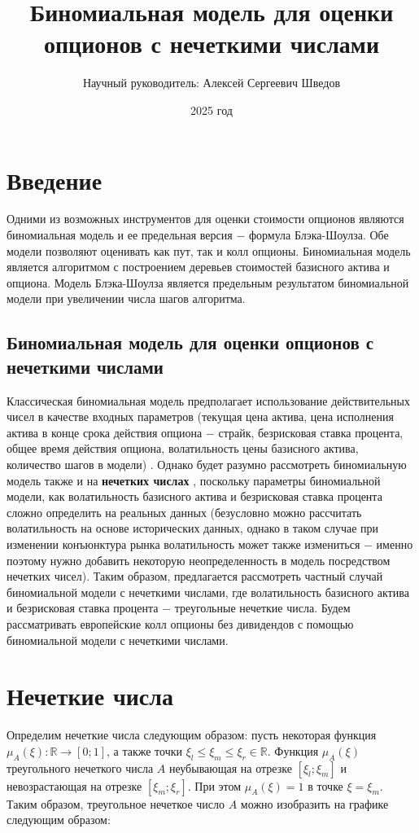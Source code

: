 \documentclass[a4paper, 12pt]{extarticle}
\title{Биномиальная модель для оценки опционов с нечеткими числами}
\author{Научный руководитель: Алексей Сергеевич Шведов}
\date{2025 год}
\begin{document}
	
	\maketitle{}
	
	\section{Введение}
	Одними из возможных инструментов для оценки стоимости опционов являются биномиальная модель и ее предельная версия $-$ формула Блэка-Шоулза. Обе модели позволяют оценивать как пут, так и колл опционы. Биномиальная модель является алгоритмом с построением деревьев стоимостей базисного актива и опциона. Модель Блэка-Шоулза является предельным результатом биномиальной модели при увеличении числа шагов алгоритма. 
	
		\subsection{Биномиальная модель для оценки опционов с нечеткими числами}
		Классическая биномиальная модель предполагает использование действительных чисел в качестве входных параметров (текущая цена актива, цена исполнения актива в конце срока действия опциона $-$ страйк, безрисковая ставка процента, общее время действия опциона, волатильность цены базисного актива, количество шагов в модели) \cite{5}. Однако будет разумно рассмотреть биномиальную модель также и на \textbf{нечетких числах} \cite{3}, поскольку параметры биномиальной модели, как волатильность базисного актива и безрисковая ставка процента сложно определить на реальных данных (безусловно можно рассчитать волатильность на основе исторических данных, однако в таком случае при изменении конъюнктура рынка волатильность может также измениться $-$ именно поэтому нужно добавить некоторую неопределенность в модель посредством нечетких чисел). Таким образом, предлагается рассмотреть частный случай биномиальной модели с нечеткими числами, где волатильность базисного актива и безрисковая ставка процента $-$ треугольные нечеткие числа. Будем рассматривать европейские колл опционы без дивидендов с помощью биномиальной модели с нечеткими числами. 
	
	\section{Нечеткие числа}
	Определим нечеткие числа следующим образом: 
	пусть некоторая функция $\mu_A (\xi): \mathbb{R} \rightarrow [0;1]$, а также точки $\xi_l \leq \xi_m \leq \xi_r \in \mathbb{R}$. Функция $\mu_A(\xi)$ треугольного нечеткого числа $A$ неубывающая на отрезке $[\xi_l;\xi_m]$ и невозрастающая на отрезке $[\xi_m;\xi_r]$. При этом $\mu_A(\xi)=1$ в точке $\xi=\xi_m$. Таким образом, треугольное нечеткое число $A$ можно изобразить на графике следующим образом:
	
\end{document}
